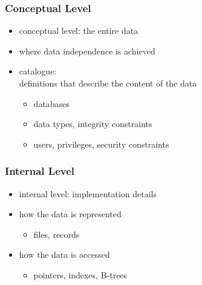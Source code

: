 \documentclass[dvipsnames]{beamer}
\theoremstyle{plain}
\begin{document}
\begin{frame}
  \frametitle{Conceptual Level}

  \begin{itemize}
    \item conceptual level: the entire data
    \item where data independence is achieved

    \pause
    \bigskip
    \item \alert{catalogue}:\\
      definitions that describe the content of the data
    \begin{itemize}
      \item databases
      \item data types, integrity constraints
      \item users, privileges, security constraints
    \end{itemize}
  \end{itemize}
\end{frame}

\begin{frame}
  \frametitle{Internal Level}

  \begin{itemize}
    \item internal level: implementation details

    \pause
    \item how the data is represented
    \begin{itemize}
      \item files, records
    \end{itemize}

    \pause
    \item how the data is accessed
    \begin{itemize}
      \item pointers, indexes, B-trees
    \end{itemize}
  \end{itemize}
\end{frame}
\end{document}

